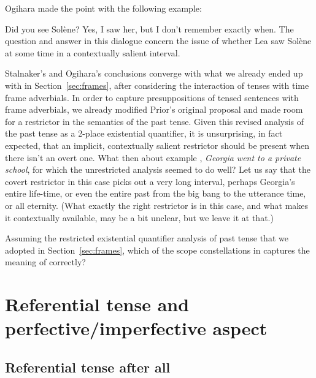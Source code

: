 Ogihara made the point with the following example:

\pex[labelformat=A:,samplelabel=Patricia]
\a[label=Patricia] Did you see Solène?
\a[label=Lea] Yes, I saw her, but I don’t remember exactly when.
\xe
%
The question and answer in this dialogue concern the issue of whether Lea saw
Solène at some time in a contextually salient interval.

Stalnaker's and Ogihara's conclusions converge with what we already ended up
with in Section~\ref{sec:frames}, after considering the interaction of tenses
with time frame adverbials. In order to capture presuppositions of tensed
sentences with frame adverbials, we already modified Prior's original proposal
and made room for a restrictor in the semantics of the past tense. Given this
revised analysis of the past tense as a 2-place existential quantifier, it is
unsurprising, in fact expected, that an implicit, contextually salient
restrictor should be present when there isn't an overt one. What then about
example , \emph{Georgia went to a private school}, for which the
unrestricted analysis seemed to do well? Let us say that the covert restrictor
in this case picks out a very long interval, perhaps Georgia's entire life-time,
or even the entire past from the big bang to the utterance time, or all
eternity. (What exactly the right restrictor is in this case, and what makes it
contextually available, may be a bit unclear, but we leave it at that.)

\enlargethispage{48pt}
\begin{exercise}
  Assuming the restricted existential quantifier analysis of past tense that we
  adopted in Section~\ref{sec:frames}, which of the scope constellations in
  \LLast captures the meaning of  correctly?
\end{exercise}
\vfill\clearpage

\section{Referential tense and perfective/imperfective aspect}
\label{sec:aspect}

\subsection{Referential tense after all}
\label{subsec:after-all}

